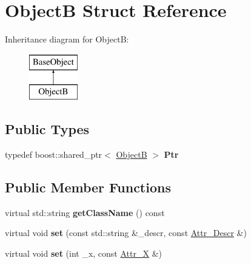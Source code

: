 \hypertarget{struct_object_b}{
\section{ObjectB Struct Reference}
\label{struct_object_b}
}
Inheritance diagram for ObjectB:\begin{figure}[H]
\begin{center}
\leavevmode
\includegraphics[height=2.000000cm]{struct_object_b}
\end{center}
\end{figure}
\subsection*{Public Types}
\begin{DoxyCompactItemize}
\item 
\hypertarget{struct_object_b_a4d11ff18fe2178ed5bec9474539f5641}{
typedef boost::shared\_\-ptr$<$ \hyperlink{struct_object_b}{ObjectB} $>$ {\bfseries Ptr}}
\label{struct_object_b_a4d11ff18fe2178ed5bec9474539f5641}

\end{DoxyCompactItemize}
\subsection*{Public Member Functions}
\begin{DoxyCompactItemize}
\item 
\hypertarget{struct_object_b_a736a840f3668a60413872ee51e96411d}{
virtual std::string {\bfseries getClassName} () const }
\label{struct_object_b_a736a840f3668a60413872ee51e96411d}

\item 
\hypertarget{struct_object_b_a35e51f9c71312ec9793ac39ace654902}{
virtual void {\bfseries set} (const std::string \&\_\-descr, const \hyperlink{struct_attr___descr}{Attr\_\-Descr} \&)}
\label{struct_object_b_a35e51f9c71312ec9793ac39ace654902}

\item 
\hypertarget{struct_object_b_ade2012308c1574bbcc537d37e7769a76}{
virtual void {\bfseries set} (int \_\-x, const \hyperlink{struct_attr___x}{Attr\_\-X} \&)}
\label{struct_object_b_ade2012308c1574bbcc537d37e7769a76}

\end{DoxyCompactItemize}

